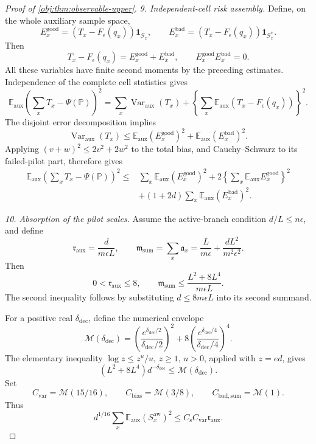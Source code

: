 \documentclass[11pt]{article}
\begin{document}
\begin{proof}[Proof of \cref{obj:thm:observable-upper}]
\textit{9. Independent-cell risk assembly.}
Define, on the whole auxiliary sample space,
\[
E_x^{\mathrm{good}}
=
(T_x-F_\epsilon(q_x))\mathbf1_{\mathcal G_x},
\qquad
E_x^{\mathrm{bad}}
=
(T_x-F_\epsilon(q_x))\mathbf1_{\mathcal G_x^c}.
\]
Then
\[
T_x-F_\epsilon(q_x)=E_x^{\mathrm{good}}+E_x^{\mathrm{bad}},
\qquad
E_x^{\mathrm{good}}E_x^{\mathrm{bad}}=0.
\]
All these variables have finite second moments by the preceding estimates. Independence of the complete cell statistics gives
\[
\mathbb E_{\mathrm{aux}}
\left(\sum_xT_x-\Psi(\mathbb P)\right)^2
=
\sum_x\operatorname{Var}_{\mathrm{aux}}(T_x)
+
\left\{\sum_x
\mathbb E_{\mathrm{aux}}(T_x-F_\epsilon(q_x))\right\}^2.
\]
The disjoint error decomposition implies
\[
\operatorname{Var}_{\mathrm{aux}}(T_x)
\le
\mathbb E_{\mathrm{aux}}(E_x^{\mathrm{good}})^2
+
\mathbb E_{\mathrm{aux}}(E_x^{\mathrm{bad}})^2.
\]
Applying \((v+w)^2\le2v^2+2w^2\) to the total bias, and Cauchy--Schwarz to its failed-pilot part, therefore gives
\[
\begin{aligned}
\mathbb E_{\mathrm{aux}}
\left(\sum_xT_x-\Psi(\mathbb P)\right)^2
\le{}&
\sum_x\mathbb E_{\mathrm{aux}}(E_x^{\mathrm{good}})^2
+
2\left\{\sum_x\mathbb E_{\mathrm{aux}}E_x^{\mathrm{good}}\right\}^2\\
&+
(1+2d)\sum_x\mathbb E_{\mathrm{aux}}(E_x^{\mathrm{bad}})^2.
\end{aligned}
\]

\textit{10. Absorption of the pilot scales.}
Assume the active-branch condition \(d/L\le n\epsilon\), and define
\[
\mathfrak r_{\mathrm{aux}}=\frac{d}{m\epsilon L},
\qquad
\mathfrak m_{\mathrm{sum}}
=\sum_x\mathfrak a_x
=\frac L{m\epsilon}+\frac{dL^2}{m^2\epsilon^2}.
\]
Then
\[
0<\mathfrak r_{\mathrm{aux}}\le8,
\qquad
\mathfrak m_{\mathrm{sum}}
\le\frac{L^2+8L^4}{m\epsilon L}.
\]
The second inequality follows by substituting
\(d\le8m\epsilon L\) into its second summand.

For a positive real \(\delta_{\mathrm{dec}}\), define the numerical envelope
\[
\mathcal M(\delta_{\mathrm{dec}})
=
\left(\frac{e^{\delta_{\mathrm{dec}}/2}}{\delta_{\mathrm{dec}}/2}\right)^2
+
8\left(\frac{e^{\delta_{\mathrm{dec}}/4}}{\delta_{\mathrm{dec}}/4}\right)^4.
\]
The elementary inequality \(\log z\le z^u/u\), \(z\ge1\), \(u>0\), applied with \(z=ed\), gives
\[
(L^2+8L^4)d^{-\delta_{\mathrm{dec}}}
\le\mathcal M(\delta_{\mathrm{dec}}).
\]
Set
\[
C_{\mathrm{var}}=\mathcal M(15/16),\qquad
C_{\mathrm{bias}}=\mathcal M(3/8),\qquad
C_{\mathrm{bad,sum}}=\mathcal M(1).
\]
Thus
\[
d^{1/16}\sum_x\mathbb E_{\mathrm{aux}}(S_x^{\mathrm{aw}})^2
\le C_{\mathrm s}C_{\mathrm{var}}\mathfrak r_{\mathrm{aux}}.
\]


\end{proof}
\end{document}
